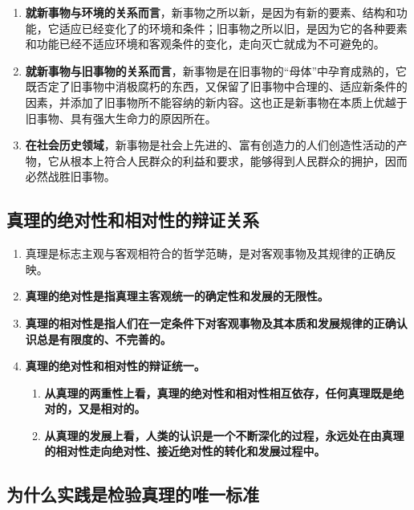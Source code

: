 \documentclass[12pt, a4paper, oneside]{ctexbook}
\begin{document}
\begin{enumerate}
\item \textbf{就新事物与环境的关系而言}，新事物之所以新，是因为有新的要素、结构和功能，它适应已经变化了的环境和条件；旧事物之所以旧，是因为它的各种要素和功能已经不适应环境和客观条件的变化，走向灭亡就成为不可避免的。
\item \textbf{就新事物与旧事物的关系而言}，新事物是在旧事物的“母体”中孕育成熟的，它既否定了旧事物中消极腐朽的东西，又保留了旧事物中合理的、适应新条件的因素，并添加了旧事物所不能容纳的新内容。这也正是新事物在本质上优越于旧事物、具有强大生命力的原因所在。
\item \textbf{在社会历史领域}，新事物是社会上先进的、富有创造力的人们创造性活动的产物，它从根本上符合人民群众的利益和要求，能够得到人民群众的拥护，因而必然战胜旧事物。
\end{enumerate}

\subsection{真理的绝对性和相对性的辩证关系}

\begin{enumerate}
\item 真理是标志主观与客观相符合的哲学范畴，是对客观事物及其规律的正确反映。
\item \textbf{真理的绝对性是指真理主客观统一的确定性和发展的无限性。}
\item \textbf{真理的相对性是指人们在一定条件下对客观事物及其本质和发展规律的正确认识总是有限度的、不完善的。}
\item \textbf{真理的绝对性和相对性的辩证统一。}
\begin{enumerate}
\item \textbf{从真理的两重性上看，真理的绝对性和相对性相互依存，任何真理既是绝对的，又是相对的。}
\item \textbf{从真理的发展上看，人类的认识是一个不断深化的过程，永远处在由真理的相对性走向绝对性、接近绝对性的转化和发展过程中。}
\end{enumerate}
\end{enumerate}

\subsection{为什么实践是检验真理的唯一标准}
\end{document}
